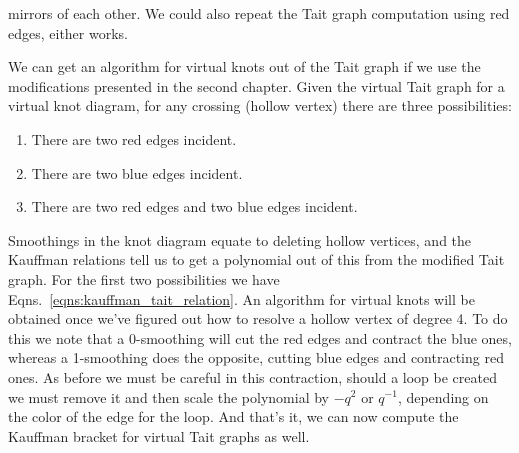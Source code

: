             mirrors of each other. We could also repeat the Tait graph
            computation using red edges, either works.
            \par\hfill\par
            We can get an algorithm for virtual knots out of the Tait graph
            if we use the modifications presented in the second chapter. Given
            the virtual Tait graph for a virtual knot diagram, for any
            crossing (hollow vertex) there are three possibilities:
            \begin{enumerate}
                \item There are two red edges incident.
                \item There are two blue edges incident.
                \item There are two red edges and two blue edges incident.
            \end{enumerate}
            Smoothings in the knot diagram equate to deleting hollow vertices,
            and the Kauffman relations tell us to get a polynomial out of this
            from the modified Tait graph. For the first two possibilities we
            have Eqns.~\ref{eqns:kauffman_tait_relation}. An algorithm for
            virtual knots will be obtained once we've figured out how to
            resolve a hollow vertex of degree 4. To do this we note that
            a 0-smoothing will cut the red edges and contract the blue ones,
            whereas a 1-smoothing does the opposite, cutting blue edges and
            contracting red ones. As before we must be careful in this
            contraction, should a loop be created we must remove it and then
            scale the polynomial by $-q^{2}$ or $q^{-1}$, depending on the
            color of the edge for the loop. And that's it, we can now compute
            the Kauffman bracket for virtual Tait graphs as well.
